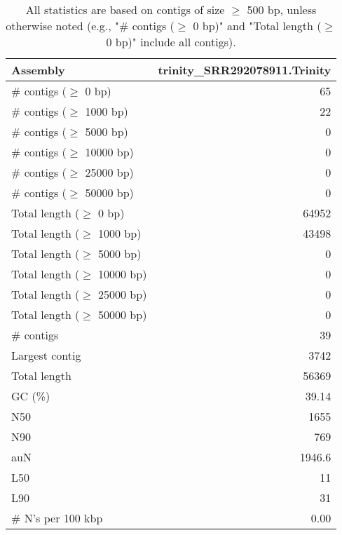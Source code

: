 \documentclass[12pt,a4paper]{article}
\begin{document}
\begin{table}[ht]
\begin{center}
\caption{All statistics are based on contigs of size $\geq$ 500 bp, unless otherwise noted (e.g., "\# contigs ($\geq$ 0 bp)" and "Total length ($\geq$ 0 bp)" include all contigs).}
\begin{tabular}{|l*{1}{|r}|}
\hline
Assembly & trinity\_SRR292078911.Trinity \\ \hline
\# contigs ($\geq$ 0 bp) & 65 \\ \hline
\# contigs ($\geq$ 1000 bp) & 22 \\ \hline
\# contigs ($\geq$ 5000 bp) & 0 \\ \hline
\# contigs ($\geq$ 10000 bp) & 0 \\ \hline
\# contigs ($\geq$ 25000 bp) & 0 \\ \hline
\# contigs ($\geq$ 50000 bp) & 0 \\ \hline
Total length ($\geq$ 0 bp) & 64952 \\ \hline
Total length ($\geq$ 1000 bp) & 43498 \\ \hline
Total length ($\geq$ 5000 bp) & 0 \\ \hline
Total length ($\geq$ 10000 bp) & 0 \\ \hline
Total length ($\geq$ 25000 bp) & 0 \\ \hline
Total length ($\geq$ 50000 bp) & 0 \\ \hline
\# contigs & 39 \\ \hline
Largest contig & 3742 \\ \hline
Total length & 56369 \\ \hline
GC (\%) & 39.14 \\ \hline
N50 & 1655 \\ \hline
N90 & 769 \\ \hline
auN & 1946.6 \\ \hline
L50 & 11 \\ \hline
L90 & 31 \\ \hline
\# N's per 100 kbp & 0.00 \\ \hline
\end{tabular}
\end{center}
\end{table}
\end{document}
